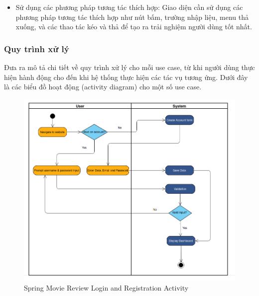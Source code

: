 \documentclass[12pt]{article}
\begin{document}
\begin{itemize}
    \item Sử dụng các phương pháp tương tác thích hợp: Giao diện cần sử dụng các phương pháp tương tác thích hợp như nút bấm, trường nhập liệu, menu thả xuống, và các thao tác kéo và thả để tạo ra trải nghiệm người dùng tốt nhất.
\end{itemize}
\subsubsection{Quy trình xử lý}
Đưa ra mô tả chi tiết về quy trình xử lý cho mỗi use case, từ khi người dùng thực hiện hành động cho đến khi hệ thống thực hiện các tác vụ tương ứng. Dưới đây là các biểu đồ hoạt động (activity diagram) cho một số use case.
\begin{figure}[H]
    \centering
    \includegraphics[scale=0.7]{Figs/login_activity.png}
    \caption{Spring Movie Review Login and Registration Activity}
\end{figure}
\end{document}
